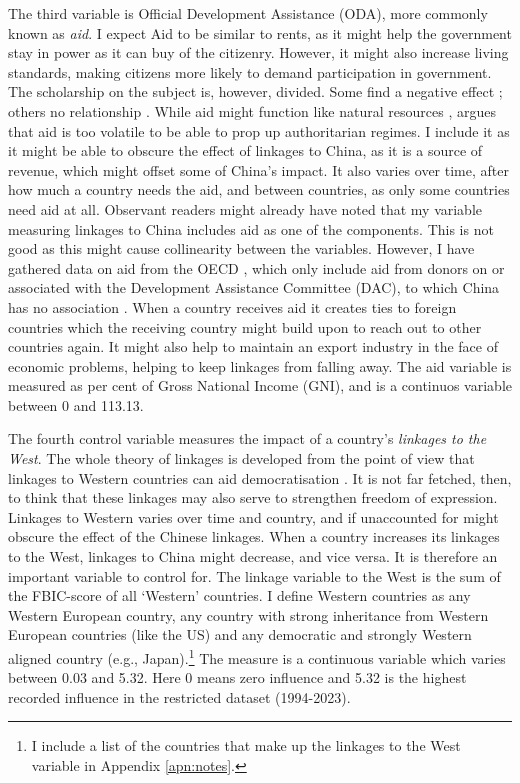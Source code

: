 The third variable is Official Development Assistance (ODA), more commonly known as \textit{aid}. I expect Aid to be similar to rents, as it might help the government stay in power as it can buy of the citizenry. However, it might also increase living standards, making citizens more likely to demand participation in government. The scholarship on the subject is, however, divided. Some find a negative effect \citep{djankov_curse_2008}; others no relationship \citep{altincekic_why_2014}. While aid might function like natural resources \citep{djankov_curse_2008}, \citet[p. 30]{altincekic_why_2014} argues that aid is too volatile to be able to prop up authoritarian regimes. I include it as it might be able to obscure the effect of linkages to China, as it is a source of revenue, which might offset some of China's impact. It also varies over time, after how much a country needs the aid, and between countries, as only some countries need aid at all. Observant readers might already have noted that my variable measuring linkages to China includes aid as one of the components. This is not good as this might cause collinearity between the variables. However, I have gathered data on aid from the OECD \citep{oecd_dac2a_2025}, which only include aid from donors on or associated with the Development Assistance Committee (DAC), to which China has no association \citep{oecd_development_2025}. When a country receives aid it creates ties to foreign countries which the receiving country might build upon to reach out to other countries again. It might also help to maintain an export industry in the face of economic problems, helping to keep linkages from falling away. The aid variable is measured as per cent of Gross National Income (GNI), and is a continuos variable between 0 and 113.13. 

The fourth control variable measures the impact of a country's \textit{linkages to the West}. The whole theory of linkages is developed from the point of view that linkages to Western countries can aid democratisation \citep{levitsky_linkage_2006}. It is not far fetched, then, to think that these linkages may also serve to strengthen freedom of expression. Linkages to Western varies over time and country, and if unaccounted for might obscure the effect of the Chinese linkages. When a country increases its linkages to the West, linkages to China might decrease, and vice versa. It is therefore an important variable to control for. The linkage variable to the West is the sum of the FBIC-score of all `Western' countries. I define Western countries as any Western European country, any country with strong inheritance from Western European countries (like the US) and any democratic and strongly Western aligned country (e.g., Japan).\footnote{I include a list of the countries that make up the linkages to the West variable in Appendix \ref{apn:notes}.} The measure is a continuous variable which varies between 0.03 and 5.32. Here 0 means zero influence and 5.32 is the highest recorded influence in the restricted dataset (1994-2023). 

